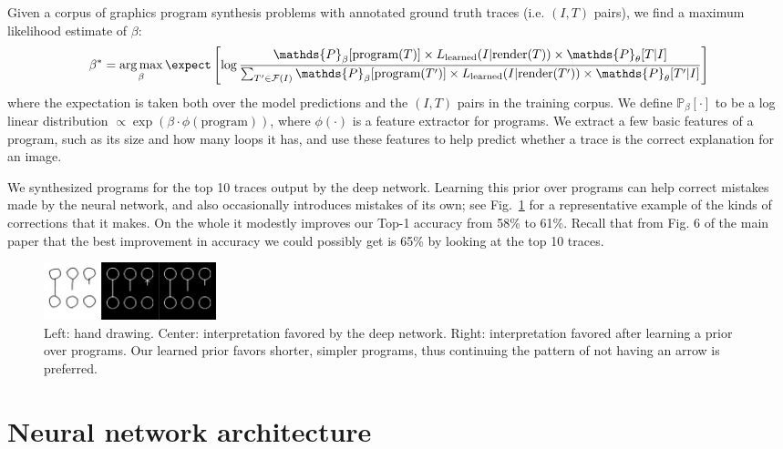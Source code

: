 \documentclass{article}
\DeclareMathOperator*{\argmax}{arg\,max} %
\newcommand{\probability}{\mathds{P}} %
\begin{document}
Given a corpus of graphics program synthesis problems with annotated ground truth traces (i.e. $(I,T)$ pairs),
we find a maximum likelihood estimate of $\beta$:
\begin{equation}
  \beta^* = \argmax_{\beta} \expect \left[ \log \frac{\probability_{\beta} [\text{program}(T)]\times L_{\text{learned}}(I|\text{render}(T))\times \probability_\theta[T|I]}{\sum_{T'\in \mathcal{F}(I)} \probability_{\beta} [\text{program}(T')]\times L_{\text{learned}}(I|\text{render}(T'))\times \probability_\theta[T'|I]} \right]
\end{equation}
where the expectation is taken both over the model predictions and the
$(I,T)$ pairs in the training corpus.  We define $\probability_{\beta}
[\cdot]$ to be a log linear distribution $\propto \exp
(\beta\cdot \phi(\text{program}))$, where $\phi(\cdot)$ is a feature
extractor for programs.  We extract a few basic features of a
program, such as its size and how many loops it has, and use these
features to help predict whether a trace is the correct explanation
for an image.

We synthesized programs for the top 10 traces
output by the deep network.  Learning this prior over programs can
help correct mistakes made by the neural network, and also
occasionally introduces mistakes of its own; see
Fig.~\ref{exampleOfProgramCorrectingMistake} for a representative
example of the kinds of corrections that it makes. On the whole
it modestly improves our Top-1 accuracy from 58\% to 61\%.  Recall that
from Fig. 6 of the main paper that the best improvement
in accuracy we could possibly get is 65\% by looking at the top 10 traces. 
\begin{figure}
  \includegraphics[width = 5cm]{figures/programSuccess7.png}
  \caption{Left: hand drawing. Center: interpretation favored by the deep network. Right: interpretation favored after learning a prior over programs. Our learned prior favors shorter, simpler programs, thus continuing the pattern of not having an arrow is preferred.}\label{exampleOfProgramCorrectingMistake}
\end{figure}


\section{Neural network architecture}
\end{document}
